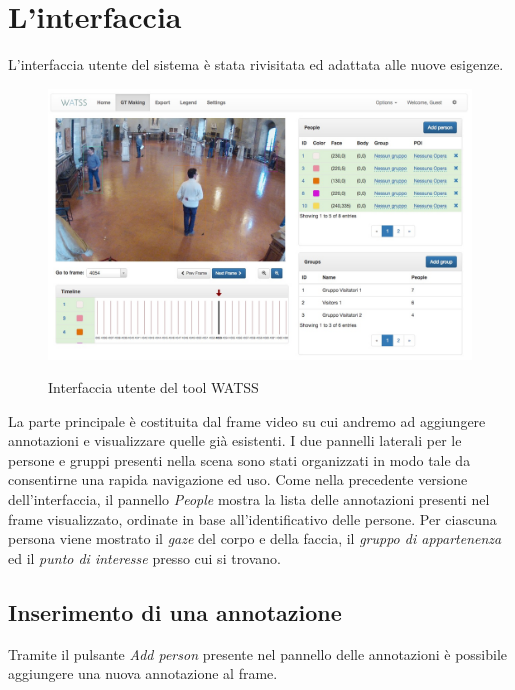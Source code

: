 \section{L'interfaccia}

L'interfaccia utente del sistema è stata rivisitata ed adattata alle nuove esigenze. 

\begin{figure}
\begin{center}
\centering
\includegraphics[width=1\linewidth]{images/watss-gui.jpg}
  \label{fig:watss-gui}
  \caption{Interfaccia utente del tool WATSS}
\end{center}
\end{figure}

La parte principale è costituita dal frame video su cui andremo ad aggiungere annotazioni e visualizzare quelle già esistenti.
I due pannelli laterali per le persone e gruppi presenti nella scena sono stati organizzati in modo tale da consentirne una rapida navigazione ed uso. Come nella precedente versione dell'interfaccia, il pannello \emph{People} mostra la lista delle annotazioni presenti nel frame visualizzato, ordinate in base all'identificativo delle persone. Per ciascuna persona viene mostrato il \emph{gaze }del corpo e della faccia, il \emph{gruppo di appartenenza} ed il \emph{punto di interesse} presso cui si trovano. 

\subsection{Inserimento di una annotazione}

Tramite il pulsante \emph{Add person} presente nel pannello delle annotazioni è possibile aggiungere una nuova annotazione al frame. 

